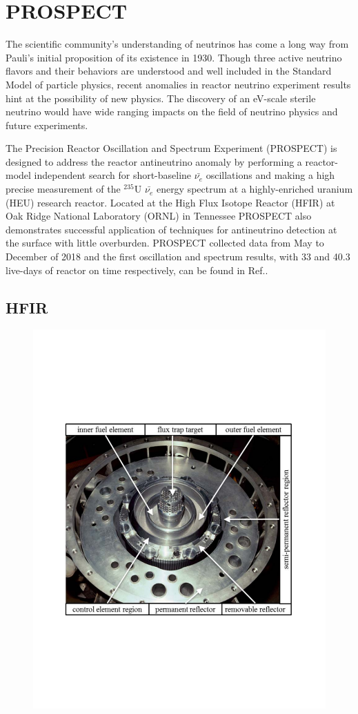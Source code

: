 \chapter{PROSPECT}

The scientific community's understanding of neutrinos has come a long way from Pauli's initial proposition of its existence in 1930. 
Though three active neutrino flavors and their behaviors are understood and well included in the Standard Model of particle physics, recent anomalies in reactor neutrino experiment results hint at the possibility of new physics. 
The discovery of an eV-scale sterile neutrino would have wide ranging impacts on the field of neutrino physics and future experiments.

The Precision Reactor Oscillation and Spectrum Experiment (PROSPECT) is designed to address the reactor antineutrino anomaly by performing a reactor-model independent search for short-baseline $\bar{\nu_{e}}$ oscillations and making a high precise measurement of the $^{235}$U $\bar{\nu_{e}}$ energy spectrum at a highly-enriched uranium (HEU) research reactor.
Located at the High Flux Isotope Reactor (HFIR) at Oak Ridge National Laboratory (ORNL) in Tennessee PROSPECT also demonstrates successful application of techniques for antineutrino detection at the surface with little overburden. 
PROSPECT collected data from May to December of 2018 and the first oscillation and spectrum results, with 33 and 40.3 live-days of reactor on time respectively, can be found in Ref.\cite{PhysRevLett.121.251802,Ashenfelter:2018jrx}.

\section{HFIR}

\begin{figure}
	\centering
	\includegraphics[width=0.7\linewidth]{tex/4-prospect-images/HFIRCore}
	\caption[]{\cite{HFIRTech}}
	\label{fig:hfircore}
\end{figure}



